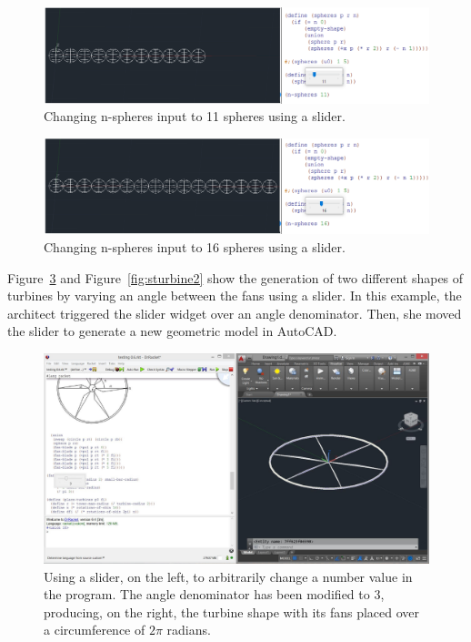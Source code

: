 \begin{figure}[!h]
  \centering
  \includegraphics[width=1\textwidth]{images/sliders2}
    \caption{Changing n-spheres input to 11 spheres using a slider.}
  \label{fig:s2}
\end{figure}

\begin{figure}[!h]
  \centering
  \includegraphics[width=1\textwidth]{images/sliders3}
    \caption{Changing n-spheres input to 16 spheres using a slider.}
  \label{fig:s3}
\end{figure}

Figure~\ref{fig:sturbine1} and Figure~\ref{fig:sturbine2} show the generation of two different shapes of turbines by varying an angle between the fans using a slider.  In this example, the architect triggered the slider widget over an angle denominator. Then, she moved the slider to generate a new geometric model in AutoCAD. 

\begin{figure}[!h]
  \centering
  \includegraphics[width=1\textwidth]{images/slider-turbine-1}
    \caption{Using a slider, on the left, to arbitrarily change a number value in the program. The angle denominator has been modified to 3, producing, on the right, the turbine shape with its fans placed over a circumference of $2\pi$ radians.}
  \label{fig:sturbine1}
\end{figure}

